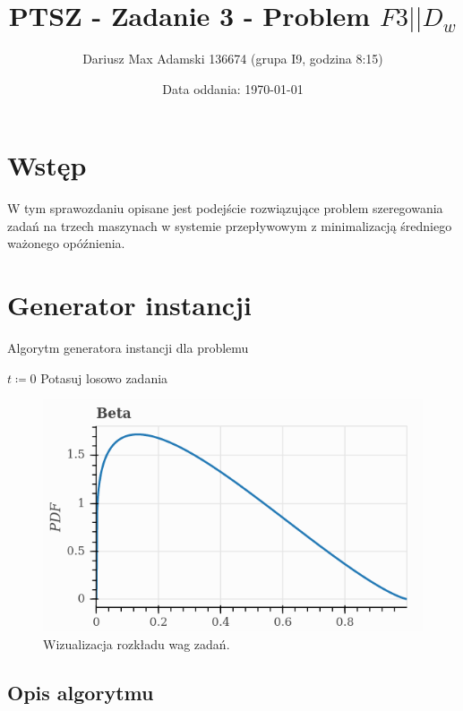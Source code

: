\documentclass[11pt]{article}
\title{PTSZ - Zadanie 3 - Problem $F3 | | D_w$}
\author{Dariusz Max Adamski 136674 (grupa I9, godzina 8:15)}
\affil{dariusz.adamski@student.put.poznan.pl}
\date{Data oddania: \today}
\begin{document}
\maketitle

\section*{Wstęp}

W tym sprawozdaniu opisane jest podejście rozwiązujące problem szeregowania zadań na trzech maszynach w systemie przepływowym z minimalizacją średniego ważonego opóźnienia.

\section{Generator instancji}

\begin{algorithm}
\caption{Algorytm generatora instancji dla problemu}
$t \coloneqq 0$ \;
Potasuj losowo zadania
\end{algorithm}

\begin{figure}[b]
\caption{Wizualizacja rozkładu wag zadań.}
\label{fig:weights}
\centering
\includegraphics[scale=0.4]{beta.png}
\end{figure}

\subsection{Opis algorytmu}
\end{document}
